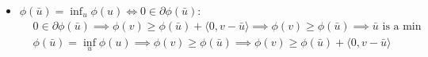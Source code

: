 \begin{itemize}
    \[ \langle y, v-u \rangle \le \abs{\phi(v) - \phi(u)} \le 1 \implies \sup_{\norm{z} \le \delta} \langle y,z \rangle \le 1. \]

    We know that $\norm{y} = \sup_{\norm{x} \le 1} \langle x,y \rangle$, therefore
    
    \[ \delta \norm{y} \le 1 \implies \norm{y} \le 1/\delta\]

    showing that $\partial\phi(u)$ is bounded.

    \item $\phi(\bar{u}) = \inf_u \phi(u) \iff 0 \in \partial\phi(\bar{u})$: 
        \begin{align*}
            &0 \in \partial\phi(\bar{u}) \implies \phi(v) \ge \phi(\bar{u}) + \langle 0, v-\bar{u} \rangle \implies \phi(v) \ge \phi(\bar{u}) \implies \bar{u} \text{ is a min} \\
            &\phi(\bar{u}) = \inf_u \phi(u) \implies \phi(v) \ge \phi(\bar{u}) \implies \phi(v) \ge \phi(\bar{u}) + \langle 0, v-\bar{u}\rangle
        \end{align*}


\end{itemize}
